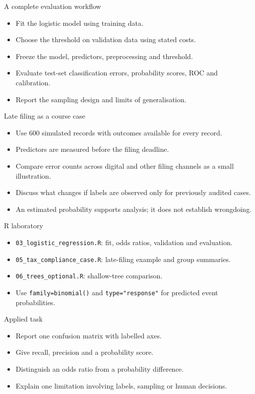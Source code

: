 \begin{frame}{A complete evaluation workflow}
\begin{itemize}
\item Fit the logistic model using training data.
\item Choose the threshold on validation data using stated costs.
\item Freeze the model, predictors, preprocessing and threshold.
\item Evaluate test-set classification errors, probability scores, ROC and calibration.
\item Report the sampling design and limits of generalisation.
\end{itemize}
\end{frame}

\begin{frame}{Late filing as a course case}
\begin{itemize}
\item Use 600 simulated records with outcomes available for every record.
\item Predictors are measured before the filing deadline.
\item Compare error counts across digital and other filing channels as a small illustration.
\item Discuss what changes if labels are observed only for previously audited cases.
\item An estimated probability supports analysis; it does not establish wrongdoing.
\end{itemize}
\end{frame}

\begin{frame}{R laboratory}
\begin{itemize}
\item \texttt{03\_logistic\_regression.R}: fit, odds ratios, validation and evaluation.
\item \texttt{05\_tax\_compliance\_case.R}: late-filing example and group summaries.
\item \texttt{06\_trees\_optional.R}: shallow-tree comparison.
\item Use \texttt{family=binomial()} and \texttt{type="response"} for predicted event probabilities.
\end{itemize}
\end{frame}

\begin{frame}{Applied task}
\begin{itemize}
\item Report one confusion matrix with labelled axes.
\item Give recall, precision and a probability score.
\item Distinguish an odds ratio from a probability difference.
\item Explain one limitation involving labels, sampling or human decisions.
\end{itemize}
\end{frame}

